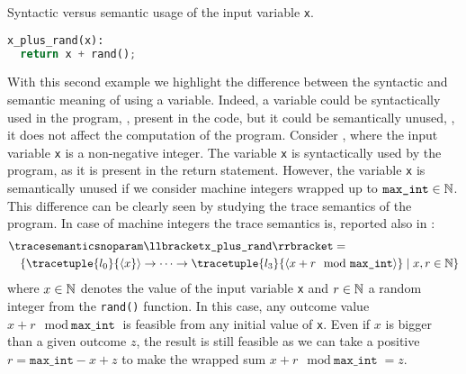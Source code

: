 \begin{example}
  \begin{marginlisting}
    \caption{Syntactic versus semantic usage of the input variable \texttt{x}.}
    \vspace{2\lineheight}
  \begin{lstlisting}[style=mystyle,language=Python]
x_plus_rand(x):
  return x + rand();
 \end{lstlisting}
  \end{marginlisting}
With this second example we highlight the difference between the syntactic and semantic meaning of using a variable. Indeed, a variable could be syntactically used in the program, \ie, present in the code, but it could be semantically unused, \ie, it does not affect the computation of the program.
Consider , where the input variable \texttt{x} is a non-negative integer.
The variable \texttt{x} is syntactically used by the program, as it is present in the return statement.
However, the variable \texttt{x} is semantically unused if we consider machine integers wrapped up to $\texttt{max\_int}\in\mathbb{N}$.
This difference can be clearly seen by studying the trace semantics of the program. In case of machine integers the trace semantics is, reported also in :
\begin{align*}
  &\tracesemanticsnoparam\semanticsof{\texttt{x\_plus\_rand}}
  =\\
  &\quad\setdef{
    \tracetuple{\locinit}{\langle{x}}\rangle\tracearrow\tracetuple{\loc{3}}{\langle{x+r \mod \texttt{max\_int}}\rangle}
  }{x, r \in \N}
\end{align*}
where $x\in\mathbb{N}$ denotes the value of the input variable \texttt{x} and $r\in\mathbb{N}$ a random integer from the \texttt{rand()} function.
In this case, any outcome value $x+r \mod \texttt{max\_int}$ is feasible from any initial value of \texttt{x}.
Even if $x$ is bigger than a given outcome $z$, the result is still feasible as we can take a positive $r = \texttt{max\_int} - x + z$ to make the wrapped sum $x + r \mod \texttt{max\_int} = z$.
\begin{marginfigure}[*-10]
\end{marginfigure}
\end{example}
